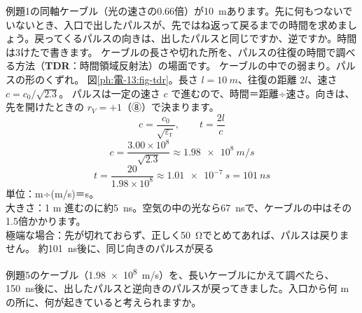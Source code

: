 \label{ph:電-13:ex5}
\begin{phreidai}
例題1の同軸ケーブル（光の速さの0.66倍）が\qty{10}{m}あります。先に何もつないでいないとき、入口で出したパルスが、先ではね返って戻るまでの時間を求めましょう。戻ってくるパルスの向きは、出したパルスと同じですか、逆ですか。時間は3けたで書きます。
\phbamen
ケーブルの長さや切れた所を、パルスの往復の時間で調べる方法（\textbf{TDR}：時間領域反射法）の場面です。
\phmushi
ケーブルの中での弱まり。パルスの形のくずれ。
\phzu
図\ref{ph:電-13:fig-tdr}。長さ $l=\qty{10}{m}$、往復の距離 $2l$、速さ $c=c_0/\sqrt{2.3}$。
\phriyu
パルスは一定の速さ $c$ で進むので、時間＝距離÷速さ。向きは、先を開けたときの $r_V=+1$（⑧）で決まります。
\phtateru
\[c=\frac{c_0}{\sqrt{\varepsilon_{\mathrm r}}},\qquad t=\frac{2l}{c}\]
\phtoku
\[c=\frac{3.00\times10^8}{\sqrt{2.3}}\approx\qty{1.98e8}{m/s}\]
\[t=\frac{20}{1.98\times10^8}\approx\qty{1.01e-7}{s}=\qty{101}{ns}\]
\phtashikame
単位：m÷(m/s)＝s。\\
大きさ：1 m 進むのに約\qty{5}{ns}。空気の中の光なら\qty{67}{ns}で、ケーブルの中はその1.5倍かかります。\\
極端な場合：先が切れておらず、正しく\qty{50}{\ohm}でとめてあれば、パルスは戻りません。
\kotae 約\qty{101}{ns}後に、同じ向きのパルスが戻る
\end{phreidai}
\begin{jibun}
例題5のケーブル（\qty{1.98e8}{m/s}）を、長いケーブルにかえて調べたら、\qty{150}{ns}後に、出したパルスと逆向きのパルスが戻ってきました。入口から何 m の所に、何が起きていると考えられますか。
\end{jibun}

